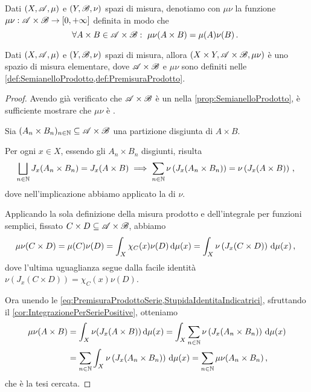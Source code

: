 \begin{definition}\label{def:PremisuraProdotto}
	Dati $(X,\mathscr A,\mu)$ e $(Y,\mathscr B,\nu)$ spazi di misura, denotiamo con $\mu\nu$ la funzione $\mu\nu:\mathscr A\times\mathscr B\to[0,+\infty]$ definita in modo che 
	\begin{equation*}
		\forall A\times B\in\mathscr A\times\mathscr B:\ \mu\nu(A\times B)=\mu(A)\nu(B)\, \text{. }
	\end{equation*}
\end{definition}

\begin{theorem}\label{thm:PremisuraProdotto}
	Dati $(X,\mathscr A,\mu)$ e $(Y,\mathscr B,\nu)$ spazi di misura, allora $(X\times Y,\mathscr A\times\mathscr B,\mu\nu)$ è uno spazio di misura elementare, dove $\mathscr A\times\mathscr B$ e $\mu\nu$ sono definiti nelle \cref{def:SemianelloProdotto,def:PremisuraProdotto}.
\end{theorem}
\begin{proof}
	Avendo già verificato che $\mathscr A\times\mathscr B$ è un \semiring{} nella \cref{prop:SemianelloProdotto}, è sufficiente mostrare che $\mu\nu$ è \sigadd{}.
	
	Sia $(A_n\times B_n)_{n\in\mathbb N}\subseteq \mathscr A\times \mathscr B$ una partizione disgiunta di $A\times B$.
	
	Per ogni $x\in X$, essendo gli $A_n\times B_n$ disgiunti, risulta
	\begin{equation}\label{eq:PremisuraProdottoSerie}
		\bigsqcup_{n\in\mathbb N} J_x(A_n\times B_n) = J_x(A\times B)  \implies \sum_{n\in\mathbb N}\nu\left(J_x(A_n\times B_n)\right)=\nu\left(J_x(A\times B)\right)\, \text{, }
	\end{equation}
	dove nell'implicazione abbiamo applicato la \sigadd[ità] di $\nu$.
	
	Applicando la sola definizione della misura prodotto e dell'integrale per funzioni semplici, fissato $C\times D\subseteq \mathscr A\times\mathscr B$, abbiamo
	\begin{equation}\label{StupidaIdentitaIndicatrici}
		\mu\nu(C\times D)=\mu(C)\nu(D)=\int_{X}\chi_C(x)\nu(D)\,\mathrm d \mu(x)=\int_X \nu\left(J_x(C\times D)\right)\,\mathrm d\mu(x)\, \text{, }
	\end{equation}
	dove l'ultima uguaglianza segue dalla facile identità $\nu\left(J_x(C\times D)\right)=\chi_C(x)\nu(D)$.
	
	Ora unendo le \cref{eq:PremisuraProdottoSerie,StupidaIdentitaIndicatrici}, sfruttando il \cref{cor:IntegrazionePerSeriePositive}, otteniamo
	\begin{align*}
		\mu\nu(A\times B)&=\int_X\nu(J_x(A\times B))\,\mathrm d \mu(x)=\int_X\sum_{n\in\mathbb N}\nu\left(J_x(A_n\times B_n)\right)\,\mathrm d\mu(x)\\
		&=\sum_{n\in\mathbb N}\int_X\nu\left(J_x(A_n\times B_n)\right)\,\mathrm d\mu(x)=\sum_{n\in\mathbb N}\mu\nu(A_n\times B_n)\, \text{, }
	\end{align*}
	che è la tesi cercata.
\end{proof}

